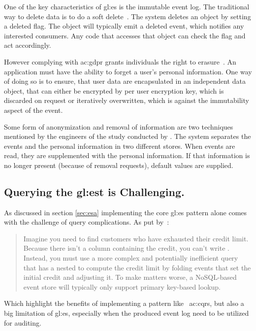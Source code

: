One of the key characteristics of \gls{gl:es} is the immutable event log. The traditional way to delete data is to do a soft delete~\citep{richardson2018microservices}. The system deletes an object by setting a deleted flag. The object will typically emit a deleted event, which notifies any interested consumers. Any code that accesses that object can check the flag and act accordingly.

However complying with \gls{ac:gdpr} grants individuals the right to erasure~\citep{Art17GDP3}. An application must have the ability to forget a user’s personal information. One way of doing so is to ensure, that user data are encapsulated in an independent data object, that can either be encrypted by per user encryption key, which is discarded on request or iteratively overwritten, which is against the immutability aspect of the event.

Some form of anonymization and removal of information are two techniques mentioned by the engineers of the study conducted by \citep{OVEREEM2021110970}. The system separates the events and the personal information in two different stores. When events are read, they are supplemented with the personal information. If that information is no longer present (because of removal requests), default values are supplied.

\subsection{Querying the \gls{gl:est} is Challenging.}

As discussed in section \ref{sec:esa} implementing the core \gls{gl:es} pattern alone comes with the challenge of query complications. As put by~\citep{richardson2018microservices}:

\begin{quote}
  Imagine you need to find customers who have exhausted their credit limit. Because there isn’t a column containing the credit, you can’t write . Instead, you must use a more complex and potentially inefficient query that has a nested  to compute the credit limit by folding events that set the initial credit and adjusting it. To make matters worse, a NoSQL-based event store will typically only support primary key-based lookup.
\end{quote}

Which highlight the benefits of implementing a pattern like ~\gls{ac:cqrs}, but also a big limitation of \gls{gl:es}, especially when the produced event log need to be utilized for auditing.

